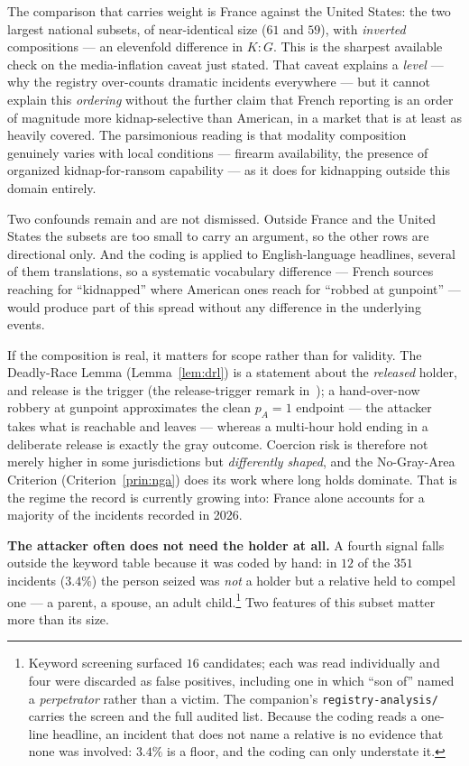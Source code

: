 \noindent The comparison that carries weight is France against the United States: the two largest
national subsets, of near-identical size ($61$ and $59$), with \emph{inverted} compositions --- an
elevenfold difference in $K{:}G$. This is the sharpest available check on the media-inflation caveat
just stated. That caveat explains a \emph{level} --- why the registry over-counts dramatic incidents
everywhere --- but it cannot explain this \emph{ordering} without the further claim that French
reporting is an order of magnitude more kidnap-selective than American, in a market that is at least
as heavily covered. The parsimonious reading is that modality composition genuinely varies with local
conditions --- firearm availability, the presence of organized kidnap-for-ransom capability --- as
it does for kidnapping outside this domain entirely.

Two confounds remain and are not dismissed. Outside France and the United States the subsets are
too small to carry an argument, so the other rows are directional only. And the coding is applied to
English-language headlines, several of them translations, so a systematic vocabulary difference ---
French sources reaching for ``kidnapped'' where American ones reach for ``robbed at gunpoint'' ---
would produce part of this spread without any difference in the underlying events.

If the composition is real, it matters for scope rather than for validity. The Deadly-Race Lemma
(Lemma~\ref{lem:drl}) is a statement about the \emph{released} holder, and release is the trigger
(the release-trigger remark in~\cite{deadly-race}); a hand-over-now robbery at gunpoint approximates the clean
$p_A = 1$ endpoint --- the attacker takes what is reachable and leaves --- whereas a multi-hour hold
ending in a deliberate release is exactly the gray outcome. Coercion risk is therefore not merely
higher in some jurisdictions but \emph{differently shaped}, and the No-Gray-Area Criterion
(Criterion~\ref{prin:nga}) does its work where long holds dominate. That is the regime the record is
currently growing into: France alone accounts for a majority of the incidents recorded in 2026.

\medskip\noindent\textbf{The attacker often does not need the holder at all.} A fourth
signal falls outside the keyword table because it was coded by hand: in $12$ of the $351$
incidents ($3.4\%$) the person seized was \emph{not} a holder but a relative held to compel
one --- a parent, a spouse, an adult child.\footnote{Keyword screening surfaced $16$ candidates;
each was read individually and four were discarded as false positives, including one in which
``son of'' named a \emph{perpetrator} rather than a victim. The companion's
\texttt{registry-analysis/}~\cite{deadly-race} carries the screen and the full audited list. Because the coding reads a one-line headline, an incident that
does not name a relative is no evidence that none was involved: $3.4\%$ is a floor, and the coding
can only understate it.} Two features of this subset matter more than its size.

